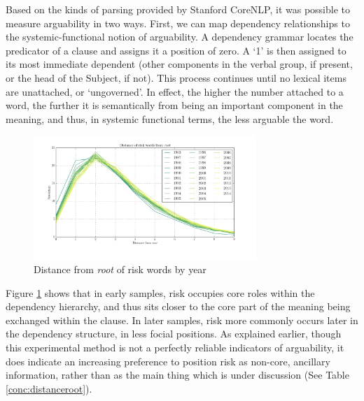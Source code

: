 
    Based on the kinds of parsing provided by Stanford CoreNLP, it was possible to measure arguability in two ways. First, we can map dependency relationships to the systemic-functional notion of arguability. A dependency grammar locates the predicator of a clause and assigns it a position of zero. A `1' is then assigned to its most immediate dependent (other components in the verbal group, if present, or the head of the Subject, if not). This process continues until no lexical items are unattached, or `ungoverned'. In effect, the higher the number attached to a word, the further it is semantically from being an important component in the meaning, and thus, in systemic functional terms, the less arguable the word.
    \begin{figure}[htb!]
    \centering
    \includegraphics[width=0.75\textwidth]{../images/dist_old_mpl_style}
    \caption{Distance from \emph{root} of risk words by year}
    \label{fig:depnum}
    \end{figure}
    Figure \ref{fig:depnum} shows that in early samples, risk occupies core roles within the dependency hierarchy, and thus sits closer to the core part of the meaning being exchanged within the clause. In later samples, risk more commonly occurs later in the dependency structure, in less focial positions. As explained earlier, though this experimental method is not a perfectly reliable indicators of arguability, it does indicate an increasing preference to position risk as non-core, ancillary information, rather than as the main thing which is under discussion (See Table \ref{conc:distanceroot}).
